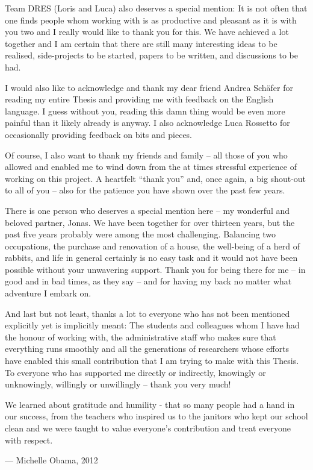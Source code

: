 Team DRES (Loris and Luca) also deserves a special mention: It is not often that one finds people whom working with is as productive and pleasant as it is with you two and I really would like to thank you for this. We have achieved a lot together and I am certain that there are still many interesting ideas to be realised, side-projects to be started, papers to be written, and discussions to be had.

I would also like to acknowledge and thank my dear friend Andrea Schäfer for reading my entire Thesis and providing me with feedback on the English language. I guess without you, reading this damn thing would be even more painful than it likely already is anyway. I also acknowledge Luca Rossetto for occasionally providing feedback on bits and pieces.

Of course, I also want to thank my friends and family -- all those of you who allowed and enabled me to wind down from the at times stressful experience of working on this project. A heartfelt ``thank you'' and, once again, a big shout-out to all of you -- also for the patience you have shown over the past few years.

There is one person who deserves a special mention here -- my wonderful and beloved partner, Jonas. We have been together for over thirteen years, but the past five years probably were among the most challenging. Balancing two occupations, the purchase and renovation of a house, the well-being of a herd of rabbits, and life in general certainly is no easy task and it would not have been possible without your unwavering support. Thank you for being there for me -- in good and in bad times, as they say -- and for having my back no matter what adventure I embark on.

And last but not least, thanks a lot to everyone who has not been mentioned explicitly yet is implicitly meant: The students and colleagues whom I have had the honour of working with, the administrative staff who makes sure that everything runs smoothly and all the generations of researchers whose efforts have enabled this small contribution that I am trying to make with this Thesis. To everyone who has supported me directly or indirectly, knowingly or unknowingly, willingly or unwillingly -- thank you very much!

\epigraph{We learned about gratitude and humility - that so many people had a hand in our success, from the teachers who inspired us to the janitors who kept our school clean and we were taught to value everyone's contribution and treat everyone with respect.}{--- \textup{Michelle Obama}, 2012}


\cleardoublepage
